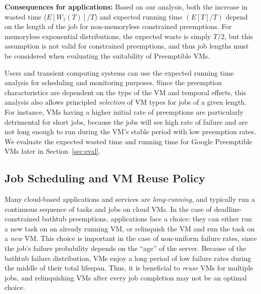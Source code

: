 
\noindent \textbf{Consequences for applications:}
Based on our analysis, both the increase in wasted time ($E[W_1(T)]/T$) and expected running time $(E[T]/T)$ depend on the length of the job for non-memoryless constrained preemptions. 
For memoryless exponential distributions, the expected waste is simply $T/2$, but this assumption is not valid for constrained preemptions, and thus job lengths must be considered when evaluating the suitability of Preemptible VMs. 


Users and transient computing systems can use the expected running time analysis for scheduling and monitoring purposes.
Since the preemption characteristics are dependent on the type of the VM and temporal effects, this analysis also allows principled \emph{selection} of VM types for jobs of a given length. 
For instance, VMs having a higher initial rate of preemptions are particularly detrimental for short jobs, because the jobs will see high rate of failure and are not long enough to run during the VM's stable period with low  preemption rates. 
We evaluate the expected wasted time and running time for Google Preemptible VMs later in Section~\ref{sec:eval}. 

\subsection{Job Scheduling and VM Reuse Policy}

Many cloud-based applications and services are \emph{long-running}, and typically run a continuous sequence of tasks and jobs on cloud VMs. 
In the case of deadline-constrained bathtub preemptions, applications face a choice: they can either run a new task on an already running VM, or relinquish the VM and run the task on a \emph{new} VM. 
This choice is important in the case of non-uniform failure rates, since the job's failure probability depends on the ``age'' of the server.
Because of the bathtub failure distribution, VMs enjoy a long period of low failure rates during the middle of their total lifespan.
Thus, it is beneficial to \emph{reuse} VMs for multiple jobs, and relinquishing VMs after every job completion may not be an optimal choice.

